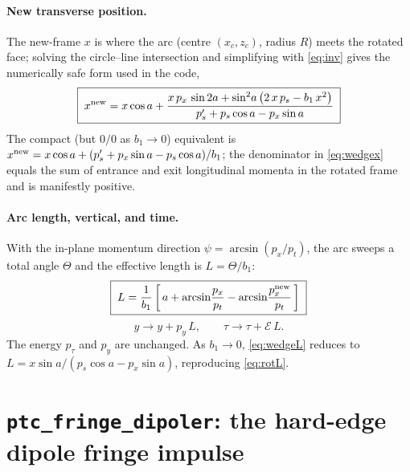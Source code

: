 \documentclass[11pt]{article}
\newcommand{\code}[1]{\texttt{#1}}
\newcommand{\ptcE}{\mathcal{E}}          %
\begin{document}
\paragraph{New transverse position.} The new-frame $x$ is where the arc (centre
$(x_c,z_c)$, radius $R$) meets the rotated face; solving the circle--line
intersection and simplifying with \eqref{eq:inv} gives the numerically safe form
used in the code,
\begin{equation}
  \boxed{\;
  x^{\rm new} = x\cos a
    + \frac{x\,p_x\,\sin 2a + \sin^2\!a\,\bigl(2\,x\,p_s - b_1\,x^2\bigr)}
           {p_s' + p_s\cos a - p_x\sin a} \;}
  \label{eq:wedgex}
\end{equation}
The compact (but $0/0$ as $b_1\to0$) equivalent is
$x^{\rm new} = x\cos a + (p_s' + p_x\sin a - p_s\cos a)/b_1$; the denominator in
\eqref{eq:wedgex} equals the sum of entrance and exit longitudinal momenta in the
rotated frame and is manifestly positive.

\paragraph{Arc length, vertical, and time.} With the in-plane momentum direction
$\psi = \arcsin(p_x/p_t)$, the arc sweeps a total angle $\Theta$ and the
effective length is $L = \Theta/b_1$:
\begin{equation}
  \boxed{\;
  L = \frac{1}{b_1}\left[\,a + \arcsin\!\frac{p_x}{p_t}
                              - \arcsin\!\frac{p_x^{\rm new}}{p_t}\,\right] \;}
  \label{eq:wedgeL}
\end{equation}
\begin{equation}
  y \to y + p_y\,L, \qquad \tau \to \tau + \ptcE\,L .
\end{equation}
The energy $p_\tau$ and $p_y$ are unchanged. As $b_1\to0$, \eqref{eq:wedgeL}
reduces to $L = x\sin a/(p_s\cos a - p_x\sin a)$, reproducing \eqref{eq:rotL}.

\section{\code{ptc\_fringe\_dipoler}: the hard-edge dipole fringe impulse}
\end{document}

